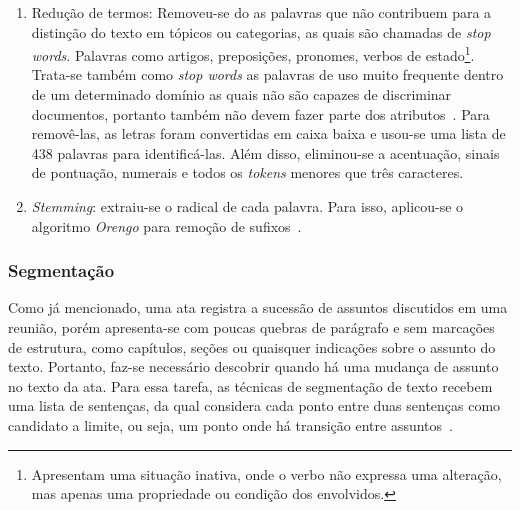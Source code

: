 \begin{enumerate}
\begin{algorithm}
	\caption{Identificação de finais de sentença.}
	\label{alg:identificacaofinaisdesent}
\end{algorithm}




\item Redução de termos: Removeu-se do as palavras que não contribuem para a distinção do texto em tópicos ou categorias, as quais são chamadas de \textit{stop words}. Palavras como artigos, preposições, pronomes, verbos de estado\footnote{Apresentam uma situação inativa, onde o verbo não expressa uma alteração, mas apenas uma propriedade ou condição dos envolvidos.}. Trata-se também como \textit{stop words} as palavras de uso muito frequente dentro de um determinado domínio as quais não são capazes de discriminar documentos, portanto também não devem fazer parte dos atributos~\cite{Rezende2003}. Para removê-las, as letras foram convertidas em caixa baixa e usou-se uma lista de 438 palavras para identificá-las. Além disso, eliminou-se a acentuação, sinais de pontuação, numerais e todos os \textit{tokens} menores que três caracteres.

\item \textit{Stemming}: extraiu-se o radical de cada palavra. Para isso, aplicou-se o algoritmo \textit{Orengo} %
	para remoção de sufixos~\cite{Alvares2005}.

\end{enumerate}
	







\subsubsection{Segmentação}

Como já mencionado, uma ata registra a sucessão de assuntos discutidos em uma reunião, porém apresenta-se com poucas quebras de parágrafo e sem marcações de estrutura, como capítulos, seções ou quaisquer indicações sobre o assunto do texto. Portanto, faz-se necessário descobrir quando há uma mudança de assunto no texto da ata. Para essa tarefa, as técnicas de segmentação de texto recebem uma lista de sentenças, da qual considera cada ponto entre duas sentenças como candidato a limite, ou seja, um ponto onde há transição entre assuntos~\cite{Bokaei2015, Bokaei2016, Misra2009, Sakahara2014}.


